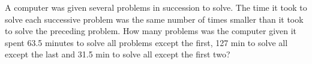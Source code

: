 
%
%
%
%
% 
% 

\question[5] A computer was given several problems in succession to solve. The time it took 
to solve each successive problem was the same number of times smaller than it took
to solve the preceding problem. How many problems was the computer given  it 
spent 63.5 minutes to solve all problems except the first, 127 min to solve all except
the last and 31.5 min to solve all except the first two?


\ifprintanswers
\fi 

